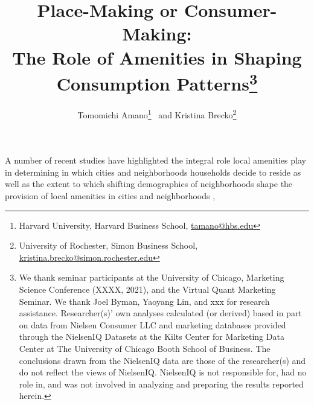 \documentclass[letter,11pt]{article}
\begin{document}
\begin{bibunit}

  \title{Place-Making or Consumer-Making: \\ The Role of Amenities in Shaping Consumption Patterns\thanks{We thank seminar participants at the University of Chicago, Marketing Science Conference (XXXX, 2021), and the Virtual Quant Marketing Seminar. We thank Joel Byman, Yaoyang Lin, and xxx for research assistance. Researcher(s)' own analyses calculated (or derived) based in part on data from Nielsen Consumer LLC and marketing databases provided through the NielsenIQ Datasets at the Kilts Center for Marketing Data Center at The University of Chicago Booth School of Business. The conclusions drawn from the NielsenIQ data are those of the researcher(s) and do not reflect the views of NielsenIQ. NielsenIQ is not responsible for, had no role in, and was not involved in analyzing and preparing the results reported herein.}}
  \author{Tomomichi Amano\thanks{Harvard University, Harvard Business School,  \href{mailto:tamano@hbs.edu}{tamano@hbs.edu}} \, and Kristina Brecko\thanks{University of Rochester, Simon Business School, \href{mailto:kristina.brecko@simon.rochester.edu}{kristina.brecko@simon.rochester.edu}}}

  \maketitle
  

  A number of recent studies have highlighted the integral role local amenities play in determining in which cities and neighborhoods households decide to reside as well as the extent to which shifting demographics of neighborhoods shape the provision of local amenities in cities and neighborhoods \cite{Kuminoffetal:2013},
  
  \putbib

\end{bibunit}
\end{document}
